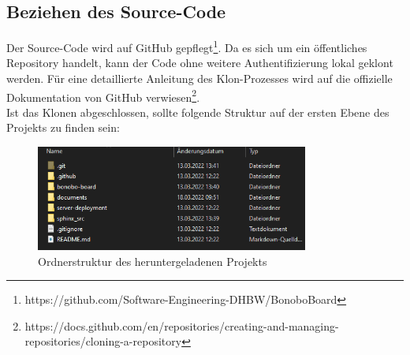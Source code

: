 \documentclass[a4paper,11pt]{scrartcl}
\begin{document}
\subsection{Beziehen des Source-Code}
Der Source-Code wird auf GitHub gepflegt\footnote{https://github.com/Software-Engineering-DHBW/BonoboBoard}. Da es sich um ein öffentliches Repository handelt, kann der Code ohne weitere Authentifizierung lokal geklont werden. Für eine detaillierte Anleitung des Klon-Prozesses wird auf die offizielle Dokumentation von GitHub verwiesen\footnote{https://docs.github.com/en/repositories/creating-and-managing-repositories/cloning-a-repository}.\\
Ist das Klonen abgeschlossen, sollte folgende Struktur auf der ersten Ebene des Projekts zu finden sein:
\begin{figure}[H]
\begin{center}
\includegraphics[width=0.8\textwidth]{folder_repo_1}
\caption{Ordnerstruktur des heruntergeladenen Projekts}
\label{img:folder_1}
\end{center}
\end{figure}
\end{document}
